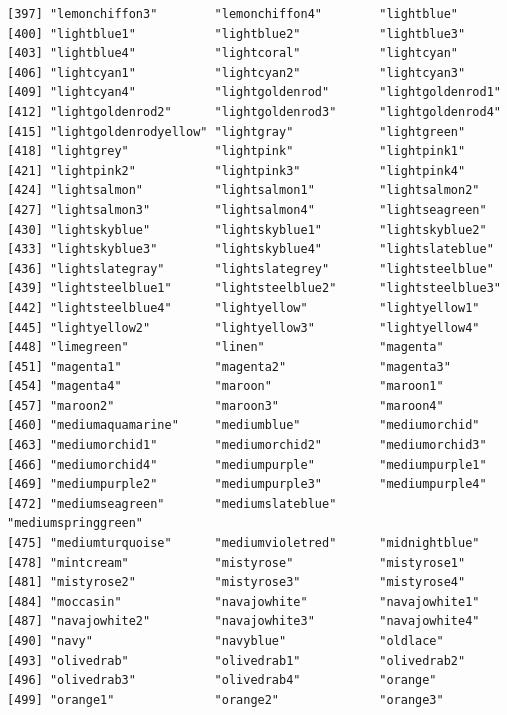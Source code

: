 \documentclass[a4paperpaper,]{article}
\theoremstyle{definition}
\theoremstyle{definition}
\theoremstyle{definition}
\theoremstyle{remark}
\begin{document}
\begin{verbatim}
[397] "lemonchiffon3"        "lemonchiffon4"        "lightblue"           
[400] "lightblue1"           "lightblue2"           "lightblue3"          
[403] "lightblue4"           "lightcoral"           "lightcyan"           
[406] "lightcyan1"           "lightcyan2"           "lightcyan3"          
[409] "lightcyan4"           "lightgoldenrod"       "lightgoldenrod1"     
[412] "lightgoldenrod2"      "lightgoldenrod3"      "lightgoldenrod4"     
[415] "lightgoldenrodyellow" "lightgray"            "lightgreen"          
[418] "lightgrey"            "lightpink"            "lightpink1"          
[421] "lightpink2"           "lightpink3"           "lightpink4"          
[424] "lightsalmon"          "lightsalmon1"         "lightsalmon2"        
[427] "lightsalmon3"         "lightsalmon4"         "lightseagreen"       
[430] "lightskyblue"         "lightskyblue1"        "lightskyblue2"       
[433] "lightskyblue3"        "lightskyblue4"        "lightslateblue"      
[436] "lightslategray"       "lightslategrey"       "lightsteelblue"      
[439] "lightsteelblue1"      "lightsteelblue2"      "lightsteelblue3"     
[442] "lightsteelblue4"      "lightyellow"          "lightyellow1"        
[445] "lightyellow2"         "lightyellow3"         "lightyellow4"        
[448] "limegreen"            "linen"                "magenta"             
[451] "magenta1"             "magenta2"             "magenta3"            
[454] "magenta4"             "maroon"               "maroon1"             
[457] "maroon2"              "maroon3"              "maroon4"             
[460] "mediumaquamarine"     "mediumblue"           "mediumorchid"        
[463] "mediumorchid1"        "mediumorchid2"        "mediumorchid3"       
[466] "mediumorchid4"        "mediumpurple"         "mediumpurple1"       
[469] "mediumpurple2"        "mediumpurple3"        "mediumpurple4"       
[472] "mediumseagreen"       "mediumslateblue"      "mediumspringgreen"   
[475] "mediumturquoise"      "mediumvioletred"      "midnightblue"        
[478] "mintcream"            "mistyrose"            "mistyrose1"          
[481] "mistyrose2"           "mistyrose3"           "mistyrose4"          
[484] "moccasin"             "navajowhite"          "navajowhite1"        
[487] "navajowhite2"         "navajowhite3"         "navajowhite4"        
[490] "navy"                 "navyblue"             "oldlace"             
[493] "olivedrab"            "olivedrab1"           "olivedrab2"          
[496] "olivedrab3"           "olivedrab4"           "orange"              
[499] "orange1"              "orange2"              "orange3"             

\end{verbatim}
\end{document}
